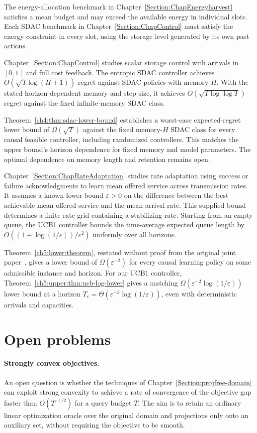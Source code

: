 The energy-allocation benchmark in Chapter~\ref{Section:ChapEnergyharvest}
satisfies a mean budget and may exceed the available energy in individual
slots. Each SDAC benchmark in Chapter~\ref{Section:ChapControl} must satisfy
the energy constraint in every slot, using the storage level generated by
its own past actions.

Chapter~\ref{Section:ChapControl} studies scalar storage control with arrivals
in $[0,1]$ and full cost feedback. The entropic SDAC controller achieves
$O(\sqrt{T\log(H+1)})$ regret against SDAC
policies with memory $H$. With the stated horizon-dependent memory and step
size, it achieves $O(\sqrt{T\log\log T})$ regret against the fixed
infinite-memory SDAC class.

Theorem~\ref{ch4:thm:sdac-lower-bound} establishes a worst-case
expected-regret lower bound of $\Omega(\sqrt T)$ against the fixed
memory-$H$ SDAC class for every causal feasible controller, including
randomized controllers. This matches the upper bound's horizon dependence
for fixed memory and model parameters. The optimal dependence on memory
length and retention remains open.

Chapter~\ref{Section:ChapRateAdaptation} studies rate adaptation using
success or failure acknowledgments to learn mean offered service across
transmission rates. It assumes a known
lower bound $\varepsilon>0$ on the difference between the best achievable mean
offered service and the mean arrival rate. This supplied bound determines
a finite rate grid containing a stabilizing rate. Starting from an empty queue, the UCB1
controller bounds the time-average expected queue length by
$O((1+\log(1/\varepsilon))/\varepsilon^2)$ uniformly over all horizons.

Theorem~\ref{ch5:lower:theorem}, restated without proof from the original
joint paper~\cite{wijewardena2026banditbased}, gives a lower bound of
$\Omega(\varepsilon^{-2})$ for every causal learning policy on some
admissible instance and horizon.
For our UCB1 controller, Theorem~\ref{ch5:upper:thm:ucb-log-lower} gives a
matching $\Omega(\varepsilon^{-2}\log(1/\varepsilon))$ lower bound at a
horizon $T_\varepsilon=\Theta(\varepsilon^{-3}\log(1/\varepsilon))$,
even with deterministic arrivals and capacities. 

\section{Open problems}

\paragraph{Strongly convex objectives.}
An open question is whether the techniques of
Chapter~\ref{Section:projfree-domain} can exploit strong convexity to
achieve a rate of convergence of the objective gap faster than
$O(T^{-1/2})$ for a query budget $T$. The aim is to retain an ordinary
linear optimization oracle over the original domain and projections only
onto an auxiliary set, without requiring the objective to be smooth.

